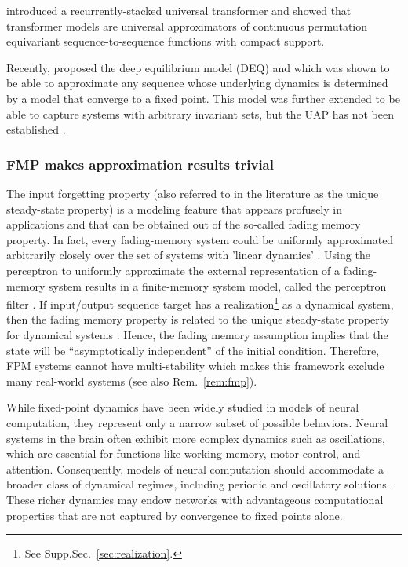 \documentclass{article}
\newcommand{\ascomment}[1]{\textcolor{ascolor}{(#1)}}
\newcounter{ct}
\begin{document}
 \citet{dehghani2018universal} introduced a recurrently-stacked universal transformer and \citet{yun2019transformers} showed that transformer models are universal approximators of continuous permutation equivariant sequence-to-sequence functions with compact support.


Recently, \citet{bai2019deq} proposed the deep equilibrium model (DEQ) and which was shown to be able to approximate any sequence whose underlying dynamics is determined by a model that converge to a fixed point.
This model was further extended to be able to capture systems with arbitrary invariant sets, but the UAP has not been established  \citep{konishi2023stable}. %


\subsubsection{FMP makes approximation results trivial} %
 The input forgetting property (also referred to in the literature as the unique steady-state property) is a modeling feature that appears profusely in applications and that can be obtained out of the so-called fading memory property.
In fact, every fading-memory system could be uniformly approximated arbitrarily closely over the set of systems with 'linear dynamics' \citep{matthews1993approximating}. %
Using the perceptron to uniformly approximate the external representation of a fading-memory system results in a finite-memory system model, called the perceptron filter  \citep{matthews1993approximating}.
%
If  input/output sequence target has a realization\footnote{See Supp.Sec.~\ref{sec:realization}.} as a dynamical system, then the fading memory property is related to the unique steady-state property for dynamical systems  \citep{chua1976qualitative}.
Hence, the fading memory assumption implies that the state will be “asymptotically independent” of the initial condition.
Therefore, FPM systems cannot have multi-stability which makes this framework exclude many real-world systems (see also Rem.~\ref{rem:fmp}).

While fixed-point dynamics have been widely studied in models of neural computation, they represent only a narrow subset of possible behaviors.
Neural systems in the brain often exhibit more complex dynamics such as oscillations, which are essential for functions like working memory, motor control, and attention.
Consequently, models of neural computation should accommodate a broader class of dynamical regimes, including periodic and oscillatory solutions \citep{townley2000existence, kag2020rnns, chang2019antisymmetricrnn, rapp1987periodic}.
These richer dynamics may endow networks with advantageous computational properties that are not captured by convergence to fixed points alone.
\end{document}
